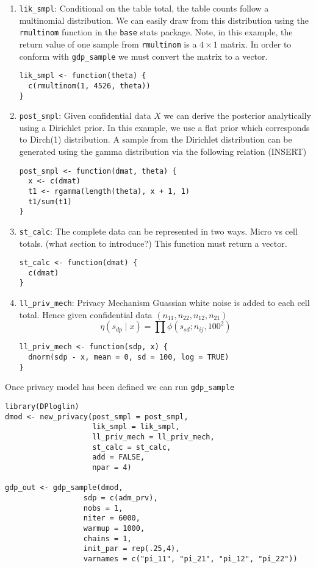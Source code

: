 \begin{enumerate}
\def\labelenumi{\arabic{enumi}.}
\item
  \texttt{lik\_smpl}: Conditional on the table total, the table counts follow a multinomial
  distribution. We can easily draw from this distribution using the
  \texttt{rmultinom} function in the \texttt{base} stats package. Note, in this example,
  the return value of one sample from \texttt{rmultinom} is a \(4 \times 1\) matrix. In order to
  conform with \texttt{gdp\_sample} we must convert the matrix to a vector.

\begin{verbatim}
lik_smpl <- function(theta) {
  c(rmultinom(1, 4526, theta))
}
\end{verbatim}
\item
  \texttt{post\_smpl}: Given confidential data \(X\) we can derive the posterior analytically
  using a Dirichlet prior. In this example, we use a flat prior which
  corresponds to Dirch(1) distribution. A sample from the Dirichlet distribution
  can be generated using the gamma distribution via the following relation (INSERT)

\begin{verbatim}
post_smpl <- function(dmat, theta) {
  x <- c(dmat)
  t1 <- rgamma(length(theta), x + 1, 1)
  t1/sum(t1)
}
\end{verbatim}
\item
  \texttt{st\_calc}: The complete data can be represented in two ways. Micro vs cell totals.
  (what section to introduce?) This function must return a vector.

\begin{verbatim}
st_calc <- function(dmat) {
  c(dmat)
}
\end{verbatim}
\item
  \texttt{ll\_priv\_mech}: Privacy Mechanism
  Guassian white noise is added to each cell total. Hence given
  confidential data \((n_{11}, n_{22}, n_{12}, n_{21})\)
  \[
  \eta(s_{dp} \mid x) = \prod \phi(s_{sd}; n_{ij}, 100^2)
  \]

\begin{verbatim}
ll_priv_mech <- function(sdp, x) {
  dnorm(sdp - x, mean = 0, sd = 100, log = TRUE)
}
\end{verbatim}
\end{enumerate}

Once privacy model has been defined we can run \texttt{gdp\_sample}

\begin{verbatim}
library(DPloglin)
dmod <- new_privacy(post_smpl = post_smpl,
                    lik_smpl = lik_smpl,
                    ll_priv_mech = ll_priv_mech,
                    st_calc = st_calc,
                    add = FALSE,
                    npar = 4)

gdp_out <- gdp_sample(dmod,
                  sdp = c(adm_prv),
                  nobs = 1,
                  niter = 6000,
                  warmup = 1000,
                  chains = 1,
                  init_par = rep(.25,4),
                  varnames = c("pi_11", "pi_21", "pi_12", "pi_22"))
\end{verbatim}

